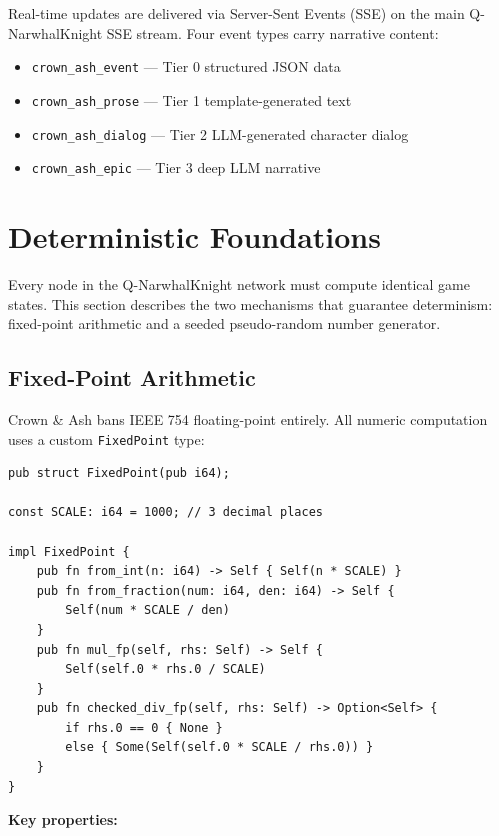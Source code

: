 \documentclass[a4paper, 11pt]{article}
\newcommand{\fp}{\texttt{FixedPoint}}
\begin{document}
Real-time updates are delivered via Server-Sent Events (SSE) on the main
Q-NarwhalKnight SSE stream. Four event types carry narrative content:

\begin{itemize}
  \item \texttt{crown\_ash\_event} --- Tier 0 structured JSON data
  \item \texttt{crown\_ash\_prose} --- Tier 1 template-generated text
  \item \texttt{crown\_ash\_dialog} --- Tier 2 LLM-generated character dialog
  \item \texttt{crown\_ash\_epic} --- Tier 3 deep LLM narrative
\end{itemize}


\section{Deterministic Foundations}
\label{sec:determinism}

Every node in the Q-NarwhalKnight network must compute identical game states.
This section describes the two mechanisms that guarantee determinism:
fixed-point arithmetic and a seeded pseudo-random number generator.

\subsection{Fixed-Point Arithmetic}
\label{sec:fixedpoint}

Crown \& Ash bans IEEE 754 floating-point entirely. All numeric computation
uses a custom \fp{} type:

\begin{lstlisting}[caption={FixedPoint core definition.}]
pub struct FixedPoint(pub i64);

const SCALE: i64 = 1000; // 3 decimal places

impl FixedPoint {
    pub fn from_int(n: i64) -> Self { Self(n * SCALE) }
    pub fn from_fraction(num: i64, den: i64) -> Self {
        Self(num * SCALE / den)
    }
    pub fn mul_fp(self, rhs: Self) -> Self {
        Self(self.0 * rhs.0 / SCALE)
    }
    pub fn checked_div_fp(self, rhs: Self) -> Option<Self> {
        if rhs.0 == 0 { None }
        else { Some(Self(self.0 * SCALE / rhs.0)) }
    }
}
\end{lstlisting}

\textbf{Key properties:}
\end{document}
